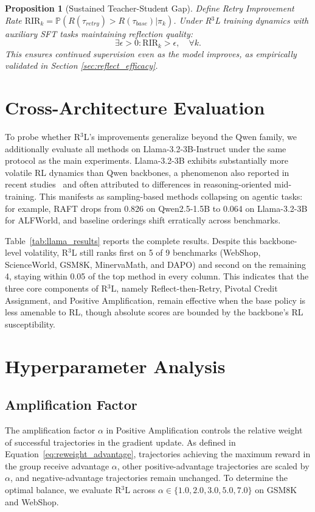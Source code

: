 \documentclass[11pt]{article}
\newtheorem{proposition}[theorem]{Proposition}
\theoremstyle{definition}
\theoremstyle{remark}
\begin{document}
\begin{proposition}[Sustained Teacher-Student Gap]
\label{prop:gap}
Define Retry Improvement Rate $\text{RIR}_k = \mathbb{P}(R(\tau_{retry}) > R(\tau_{base}) | \pi_k)$. Under R$^3$L training dynamics with auxiliary SFT tasks maintaining reflection quality:
\begin{equation}
\exists \epsilon > 0 : \text{RIR}_k > \epsilon, \quad \forall k.
\end{equation}
This ensures continued supervision even as the model improves, as empirically validated in Section \ref{sec:reflect_efficacy}.
\end{proposition}


\section{Cross-Architecture Evaluation}
\label{sec:cross_arch}

To probe whether R$^3$L's improvements generalize beyond the Qwen family, we additionally evaluate all methods on Llama-3.2-3B-Instruct under the same protocol as the main experiments. Llama-3.2-3B exhibits substantially more volatile RL dynamics than Qwen backbones, a phenomenon also reported in recent studies~\cite{zhang2025interplay} and often attributed to differences in reasoning-oriented mid-training. This manifests as sampling-based methods collapsing on agentic tasks: for example, RAFT drops from 0.826 on Qwen2.5-1.5B to 0.064 on Llama-3.2-3B for ALFWorld, and baseline orderings shift erratically across benchmarks.



Table~\ref{tab:llama_results} reports the complete results. Despite this backbone-level volatility, R$^3$L still ranks first on 5 of 9 benchmarks (WebShop, ScienceWorld, GSM8K, MinervaMath, and DAPO) and second on the remaining 4, staying within 0.05 of the top method in every column. This indicates that the three core components of R$^3$L, namely Reflect-then-Retry, Pivotal Credit Assignment, and Positive Amplification, remain effective when the base policy is less amenable to RL, though absolute scores are bounded by the backbone's RL susceptibility.

\section{Hyperparameter Analysis}
\label{sec:hyperparam}

\subsection{Amplification Factor}
The amplification factor $\alpha$ in Positive Amplification controls the relative weight of successful trajectories in the gradient update. As defined in Equation~\ref{eq:reweight_advantage}, trajectories achieving the maximum reward in the group receive advantage $\alpha$, other positive-advantage trajectories are scaled by $\alpha$, and negative-advantage trajectories remain unchanged. To determine the optimal balance, we evaluate R$^3$L across $\alpha \in \{1.0, 2.0, 3.0, 5.0, 7.0\}$ on GSM8K and WebShop.
\end{document}
